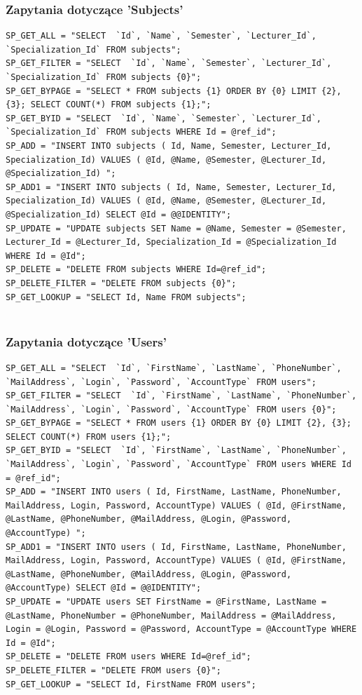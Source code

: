 \documentclass[12pt,a4paper]{article}
\begin{document}
 			\subsubsection{Zapytania dotyczące 'Subjects'}
			\begin{lstlisting}
SP_GET_ALL = "SELECT  `Id`, `Name`, `Semester`, `Lecturer_Id`, `Specialization_Id` FROM subjects";
SP_GET_FILTER = "SELECT  `Id`, `Name`, `Semester`, `Lecturer_Id`, `Specialization_Id` FROM subjects {0}";
SP_GET_BYPAGE = "SELECT * FROM subjects {1} ORDER BY {0} LIMIT {2}, {3}; SELECT COUNT(*) FROM subjects {1};";
SP_GET_BYID = "SELECT  `Id`, `Name`, `Semester`, `Lecturer_Id`, `Specialization_Id` FROM subjects WHERE Id = @ref_id";
SP_ADD = "INSERT INTO subjects ( Id, Name, Semester, Lecturer_Id, Specialization_Id) VALUES ( @Id, @Name, @Semester, @Lecturer_Id, @Specialization_Id) ";
SP_ADD1 = "INSERT INTO subjects ( Id, Name, Semester, Lecturer_Id, Specialization_Id) VALUES ( @Id, @Name, @Semester, @Lecturer_Id, @Specialization_Id) SELECT @Id = @@IDENTITY";
SP_UPDATE = "UPDATE subjects SET Name = @Name, Semester = @Semester, Lecturer_Id = @Lecturer_Id, Specialization_Id = @Specialization_Id WHERE Id = @Id";
SP_DELETE = "DELETE FROM subjects WHERE Id=@ref_id";
SP_DELETE_FILTER = "DELETE FROM subjects {0}";
SP_GET_LOOKUP = "SELECT Id, Name FROM subjects";
			
			\end{lstlisting}
\clearpage	\subsubsection{Zapytania dotyczące 'Users'}
			\begin{lstlisting}
SP_GET_ALL = "SELECT  `Id`, `FirstName`, `LastName`, `PhoneNumber`, `MailAddress`, `Login`, `Password`, `AccountType` FROM users";
SP_GET_FILTER = "SELECT  `Id`, `FirstName`, `LastName`, `PhoneNumber`, `MailAddress`, `Login`, `Password`, `AccountType` FROM users {0}";
SP_GET_BYPAGE = "SELECT * FROM users {1} ORDER BY {0} LIMIT {2}, {3}; SELECT COUNT(*) FROM users {1};";
SP_GET_BYID = "SELECT  `Id`, `FirstName`, `LastName`, `PhoneNumber`, `MailAddress`, `Login`, `Password`, `AccountType` FROM users WHERE Id = @ref_id";
SP_ADD = "INSERT INTO users ( Id, FirstName, LastName, PhoneNumber, MailAddress, Login, Password, AccountType) VALUES ( @Id, @FirstName, @LastName, @PhoneNumber, @MailAddress, @Login, @Password, @AccountType) ";
SP_ADD1 = "INSERT INTO users ( Id, FirstName, LastName, PhoneNumber, MailAddress, Login, Password, AccountType) VALUES ( @Id, @FirstName, @LastName, @PhoneNumber, @MailAddress, @Login, @Password, @AccountType) SELECT @Id = @@IDENTITY";
SP_UPDATE = "UPDATE users SET FirstName = @FirstName, LastName = @LastName, PhoneNumber = @PhoneNumber, MailAddress = @MailAddress, Login = @Login, Password = @Password, AccountType = @AccountType WHERE Id = @Id";
SP_DELETE = "DELETE FROM users WHERE Id=@ref_id";
SP_DELETE_FILTER = "DELETE FROM users {0}";
SP_GET_LOOKUP = "SELECT Id, FirstName FROM users";
			
			\end{lstlisting}
\end{document}
